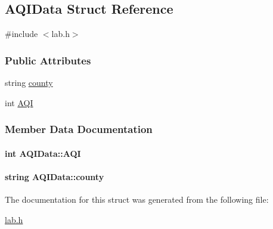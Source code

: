 \hypertarget{structAQIData}{\subsection{A\+Q\+I\+Data Struct Reference}
\label{structAQIData}
}


{\ttfamily \#include $<$lab.\+h$>$}

\subsubsection*{Public Attributes}
\begin{DoxyCompactItemize}
\item 
string \hyperlink{structAQIData_a8491fd5d9608d9be9f820868780a97b8}{county}
\item 
int \hyperlink{structAQIData_a4078cc02f4de75228f0880ea84bdedc6}{A\+Q\+I}
\end{DoxyCompactItemize}


\subsubsection{Member Data Documentation}
\hypertarget{structAQIData_a4078cc02f4de75228f0880ea84bdedc6}{
\paragraph[{A\+Q\+I}]{\setlength{\rightskip}{0pt plus 5cm}int A\+Q\+I\+Data\+::\+A\+Q\+I}}\label{structAQIData_a4078cc02f4de75228f0880ea84bdedc6}
\hypertarget{structAQIData_a8491fd5d9608d9be9f820868780a97b8}{
\paragraph[{county}]{\setlength{\rightskip}{0pt plus 5cm}string A\+Q\+I\+Data\+::county}}\label{structAQIData_a8491fd5d9608d9be9f820868780a97b8}


The documentation for this struct was generated from the following file\+:\begin{DoxyCompactItemize}
\item 
\hyperlink{lab_8h}{lab.\+h}\end{DoxyCompactItemize}
